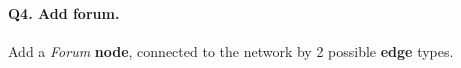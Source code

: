 \paragraph{\textbf{Q4}. Add forum.}
Add a \emph{Forum} \textbf{node}, connected to the network by 2 possible
\textbf{edge} types.
